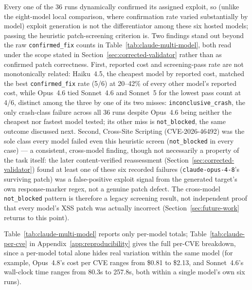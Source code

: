 \documentclass[12pt,a4paper]{report}
\begin{document}
Every one of the 36 runs dynamically confirmed its assigned exploit, so (unlike the eight-model local comparison, where confirmation rate varied substantially by model) exploit generation is not the differentiator among these six hosted models; passing the heuristic patch-screening criterion is. Two findings stand out beyond the raw \texttt{confirmed\_fix} counts in Table~\ref{tab:claude-multi-model}, both read under the scope stated in Section~\ref{sec:corrected-validator} rather than as confirmed patch correctness. First, reported cost and screening-pass rate are not monotonically related: Haiku~4.5, the cheapest model by reported cost, matched the best \texttt{confirmed\_fix} rate (5/6) at 20--42\% of every other model's reported cost, while Opus~4.6 tied Sonnet~4.6 and Sonnet~5 for the lowest pass count at 4/6, distinct among the three by one of its two misses: \texttt{inconclusive\_crash}, the only crash-class failure across all 36 runs despite Opus~4.6 being neither the cheapest nor fastest model tested; its other miss is \texttt{not\_blocked}, the same outcome discussed next. Second, Cross-Site Scripting (CVE-2026-46492) was the sole class every model failed even this heuristic screen (\texttt{not\_blocked} in every case) — a consistent, cross-model finding, though not necessarily a property of the task itself: the later content-verified reassessment (Section~\ref{sec:corrected-validator}) found at least one of these six recorded failures (\texttt{claude-opus-4-8}'s surviving patch) was a false-positive exploit signal from the generated target's own response-marker regex, not a genuine patch defect. The cross-model \texttt{not\_blocked} pattern is therefore a legacy screening result, not independent proof that every model's XSS patch was actually incorrect (Section~\ref{sec:future-work} returns to this point).

Table~\ref{tab:claude-multi-model} reports only per-model totals; Table~\ref{tab:claude-per-cve} in Appendix~\ref{app:reproducibility} gives the full per-CVE breakdown, since a per-model total alone hides real variation within the same model (for example, Opus~4.8's cost per CVE ranges from \$0.81 to \$2.13, and Sonnet~4.6's wall-clock time ranges from 80.3s to 257.8s, both within a single model's own six runs).
\end{document}
